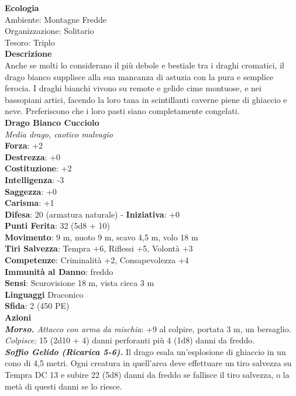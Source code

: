 \begin{multicols}{2}
\textbf{Ecologia}\\
Ambiente: Montagne Fredde\\
Organizzazione: Solitario\\
Tesoro: Triplo\\
\textbf{Descrizione}\\
Anche se molti lo considerano il più debole e bestiale tra i draghi cromatici, il drago bianco supplisce alla sua mancanza di astuzia con la pura e semplice ferocia. I draghi bianchi vivono su remote e gelide cime montuose, e nei bassopiani artici, facendo la loro tana in scintillanti caverne piene di ghiaccio e neve. Preferiscono che i loro pasti siano completamente congelati.\\


\medskip\textbf{Drago Bianco Cucciolo}\\
\emph{Media drago, caotico malvagio}\\
\textbf{Forza}: +2\\
\textbf{Destrezza}: +0\\
\textbf{Costituzione}: +2\\
\textbf{Intelligenza}: -3\\
\textbf{Saggezza}: +0\\
\textbf{Carisma}: +1\\
\textbf{Difesa}: 20 (armatura naturale) - \textbf{Iniziativa}: +0\\
\textbf{Punti Ferita}: 32 (5d8 + 10)\\
\textbf{Movimento}: 9 m, nuoto 9 m, scavo 4,5 m, volo 18 m\\
\textbf{Tiri Salvezza}: Tempra +6, Riflessi +5, Volontà +3\\
\textbf{Competenze}: Criminalità +2, Consapevolezza +4\\
\textbf{Immunità al Danno}: freddo\\
\textbf{Sensi}: Scurovisione 18 m, vista cieca 3 m\\
\textbf{Linguaggi} Draconico\\
\textbf{Sfida}: 2 (450 PE)\smallskip\\
\smallskip\textbf{Azioni}\\
\emph{\textbf{Morso.} Attacco con arma da mischia}: +9 al colpire, portata 3 m, un bersaglio.\\
\emph{Colpisce:} 15 (2d10 + 4) danni perforanti più 4 (1d8) danni da freddo.\\
\emph{\textbf{Soffio Gelido (Ricarica 5-6).}} Il drago esala un'esplosione di ghiaccio in un cono di 4,5 metri. Ogni creatura in quell'area deve effettuare un tiro salvezza su Tempra DC  13 e subire 22 (5d8) danni da freddo se fallisce il tiro salvezza, o la metà di questi danni se lo riesce.

\end{multicols}
